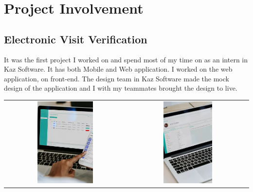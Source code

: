 \chapter{Project Involvement}

\section{Electronic Visit Verification}

It was the first project I worked on and spend most of my time on as an intern in Kaz Software.
It has both Mobile and Web application.
I worked on the web application, on front-end.
The design team in Kaz Software made the mock design of the application and I with my teammates brought the design to live.

\begin{center}
    \begin{tabular}{cc}
    \includegraphics[width=0.475\textwidth]{images/Chapter4/Evv/mock1.png} & \includegraphics[width=0.4224\textwidth]{images/Chapter4/Evv/mock2.png}
    \end{tabular}
\end{center}

